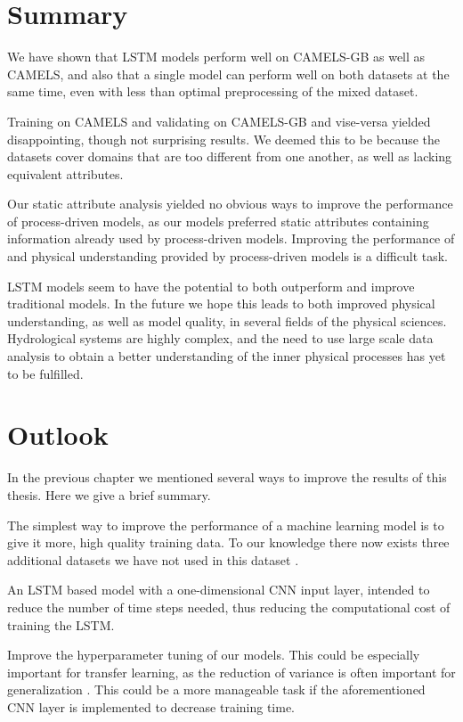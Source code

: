 \section{Summary}
We have shown that LSTM models perform well on CAMELS-GB as well as CAMELS, and 
also that a single model can perform well on both datasets at the same time, even 
with less than optimal preprocessing of the mixed dataset.

Training on CAMELS and validating on CAMELS-GB and vise-versa yielded disappointing, 
though not surprising results. We deemed this to be because the datasets cover 
domains that are too different from one another, as well as lacking equivalent 
attributes.

Our static attribute analysis yielded no obvious ways to improve the performance 
of process-driven models, as our models preferred static attributes containing 
information already used by process-driven models. Improving the performance of and 
physical understanding provided by process-driven models is a difficult task.

LSTM models seem to have the potential to both outperform and improve traditional 
models. In the future we hope this leads to both improved physical understanding, 
as well as model quality, in several fields of the physical sciences. Hydrological 
systems are highly complex, and the need to use large scale data analysis to 
obtain a better understanding of the inner physical processes has yet to be 
fulfilled. 

\section{Outlook}
In the previous chapter we mentioned several ways to improve the results of this 
thesis. Here we give a brief summary.

The simplest way to improve the performance of a machine learning model is to give 
it more, high quality training data. To our knowledge there now exists three 
additional datasets we have not used in this dataset \citep{CAMELS_CL, CAMELS_AU, CAMELS_BR}.

An LSTM based model with a one-dimensional CNN input layer, intended to reduce 
the number of time steps needed, thus reducing the computational cost of training 
the LSTM.

Improve the hyperparameter tuning of our models. This could be especially important 
for transfer learning, as the reduction of variance is often important for 
generalization \citep{elemstatlearn}. This could be a more manageable task if 
the aforementioned CNN layer is implemented to decrease training time.

